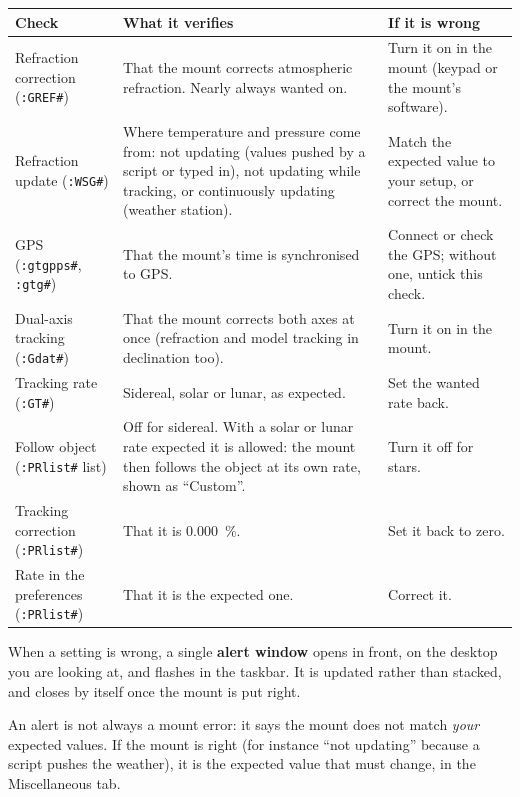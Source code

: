 \begin{center}
\begin{tabularx}{\textwidth}{p{3.3cm}Xp{4.2cm}}
\toprule
\textbf{Check} & \textbf{What it verifies} & \textbf{If it is wrong} \\
\midrule
Refraction correction (\texttt{:GREF\#}) & That the mount corrects atmospheric
refraction. Nearly always wanted on. & Turn it on in the mount (keypad or the
mount's software). \\
Refraction update (\texttt{:WSG\#}) & Where temperature and pressure come
from: not updating (values pushed by a script or typed in), not updating while
tracking, or continuously updating (weather station). & Match the expected
value to your setup, or correct the mount. \\
GPS (\texttt{:gtgpps\#}, \texttt{:gtg\#}) & That the mount's time is
synchronised to GPS. & Connect or check the GPS; without one, untick this
check. \\
Dual-axis tracking (\texttt{:Gdat\#}) & That the mount corrects both axes at
once (refraction and model tracking in declination too). & Turn it on in the
mount. \\
Tracking rate (\texttt{:GT\#}) & Sidereal, solar or lunar, as expected. & Set
the wanted rate back. \\
Follow object (\texttt{:PRlist\#} list) & Off for sidereal. With a solar or
lunar rate expected it is allowed: the mount then follows the object at its
own rate, shown as ``Custom''. & Turn it off for stars. \\
Tracking correction (\texttt{:PRlist\#}) & That it is 0.000~\%. & Set it back
to zero. \\
Rate in the preferences (\texttt{:PRlist\#}) & That it is the expected one. &
Correct it. \\
\bottomrule
\end{tabularx}
\end{center}

When a setting is wrong, a single \textbf{alert window} opens in front, on the
desktop you are looking at, and flashes in the taskbar. It is updated rather
than stacked, and closes by itself once the mount is put right.


\begin{tip}
An alert is not always a mount error: it says the mount does not match
\emph{your} expected values. If the mount is right (for instance ``not
updating'' because a script pushes the weather), it is the expected value that
must change, in the Miscellaneous tab.
\end{tip}

